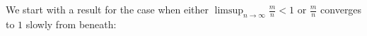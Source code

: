 \documentclass{article}
\newtheorem{Proof of Theorem}{Proof of Theorem}
\begin{document}
\begin{figure}[omitted: a diagram of this paper's results, not reproduced here]\end{figure}
















\phantom{p}





We start with a result for the case when either $\limsup_{n \to \infty} \frac{m}{n} < 1$
or $\frac{m}{n}$ converges to $1$ slowly from beneath:
\end{document}
